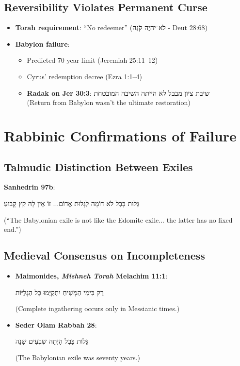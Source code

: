 \documentclass[12pt]{article}
\begin{document}
\subsection{Reversibility Violates Permanent Curse}
\begin{itemize}
    \item \textbf{Torah requirement}: ``No redeemer'' \texthebrew{(לֹא־יִהְיֶה קֹנֶה - Deut 28:68)}
    \item \textbf{Babylon failure}:
    \begin{itemize}
        \item Predicted 70-year limit (Jeremiah 25:11–12)
        \item Cyrus' redemption decree (Ezra 1:1–4)
        \item \textbf{Radak on Jer 30:3}: \texthebrew{שיבת ציון מבבל לא הייתה השיבה המובטחת} \\ (Return from Babylon wasn't the ultimate restoration)
    \end{itemize}
\end{itemize}

\section{Rabbinic Confirmations of Failure}

\subsection{Talmudic Distinction Between Exiles}
\textbf{Sanhedrin 97b}: 
\begin{hebrew}
גָּלוּת בָּבֶל לֹא דּוֹמָה לְגָלוּת אֱדוֹם... זוֹ אֵין לָהּ קֵץ קָבוּעַ
\end{hebrew}
(“The Babylonian exile is not like the Edomite exile... the latter has no fixed end.”)

\subsection{Medieval Consensus on Incompleteness}
\begin{itemize}
    \item \textbf{Maimonides, \textit{Mishneh Torah} Melachim 11:1}: 
    \begin{hebrew}
    רַק בִּימֵי הַמָּשִׁיחַ יִתְקַיְּמוּ כָּל הַגָּלֻיּוֹת
    \end{hebrew}
    (Complete ingathering occurs only in Messianic times.)
    
    \item \textbf{Seder Olam Rabbah 28}: 
    \begin{hebrew}
    גָּלוּת בָּבֶל הָיְתָה שִׁבְעִים שָׁנָה
    \end{hebrew}
    (The Babylonian exile was seventy years.)
\end{itemize}
\end{document}
